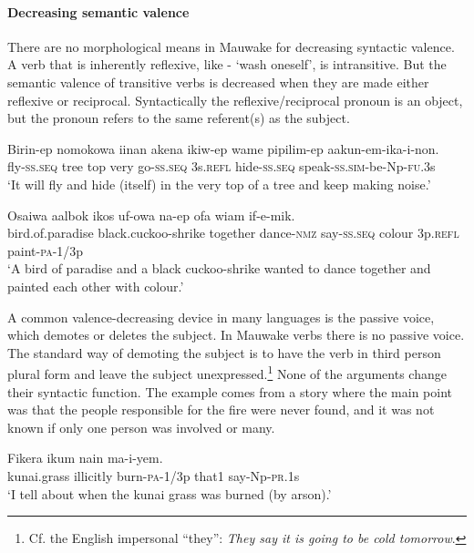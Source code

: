 \paragraph{Decreasing semantic valence}\label{sec:3.8.4.3.3}
{}
There are no morphological means in Mauwake for decreasing syntactic valence. A verb that is inherently reflexive, like - `wash oneself', is intransitive. But the semantic valence of transitive verbs is decreased when they are made either reflexive or reciprocal. Syntactically the reflexive/reciprocal pronoun is an object, but the pronoun refers to the same referent(s) as the subject. 

\ea%
\label{ex:3:x1834}
\gll Birin-ep nomokowa iinan akena ikiw-ep wame pipilim-ep aakun-em-ika-i-non.\\
fly-\textsc{ss}.\textsc{seq} tree top very go-\textsc{ss}.\textsc{seq} 3s.\textsc{refl} hide-\textsc{ss}.\textsc{seq} speak-\textsc{ss}.\textsc{sim}-be-Np-\textsc{fu}.3s\\
\glt`It will fly and hide (itself) in the very top of a tree and keep making noise.'
\z

\ea%
\label{ex:3:x1835}
\gll Osaiwa aalbok ikos uf-owa na-ep ofa wiam if-e-mik.\\
bird.of.paradise black.cuckoo-shrike together dance-\textsc{nmz} say-\textsc{ss}.\textsc{seq} colour 3p.\textsc{refl} paint-\textsc{pa}-1/3p\\
\glt`A bird of paradise and a black cuckoo-shrike wanted to dance together and painted each other with colour.'
\z

A common valence-decreasing device in many languages is the passive voice, which demotes or deletes the subject. In Mauwake verbs there is no passive voice. The standard way of demoting the subject is to have the verb in third person plural form and leave the subject  unexpressed.\footnote{Cf. the English impersonal ``they'': \textit{They say it is going to be cold tomorrow}.} None of the arguments change their syntactic function. The example  comes from a story where the main point was that the people responsible for the fire were never found, and it was not known if only one person was involved or many. 

\ea%
\label{ex:3:x1009}
\gll Fikera ikum  nain ma-i-yem. \\
kunai.grass illicitly burn-\textsc{pa}-1/3p that1 say-Np-\textsc{pr}.1s\\
\glt`I tell about when the kunai grass was burned (by arson).'
\z

